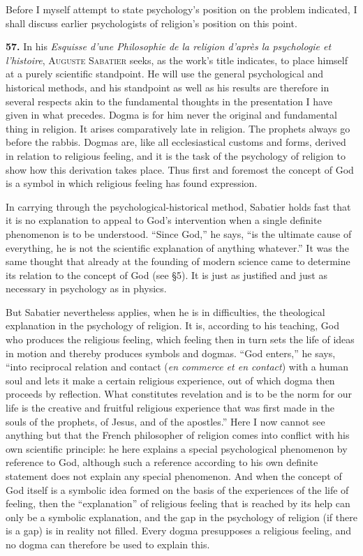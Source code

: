 \documentclass[12pt,a4paper]{book}
\newcommand{\opage}[1]{\marginnote{\footnotesize\textit{[#1]}}}
\begin{document}
Before I myself attempt to state psychology's position on the problem indicated, I shall discuss
earlier psychologists of religion's position on this point.

\medskip

\noindent\textbf{57.} In his \emph{Esquisse d'une Philosophie de la religion d'après la
psychologie et l'histoire}, \textsc{Auguste Sabatier} seeks, as the work's title indicates, to
place himself at a purely scientific standpoint. He will use the general psychological and
historical methods, and his standpoint as well as his results are therefore in several respects
akin to the fundamental thoughts in the presentation I have given in what precedes. Dogma is
for him never the original and fundamental thing in religion. It arises comparatively late in
religion. The prophets always go before the rabbis. Dogmas are, like all ecclesiastical customs
and forms, derived in relation to religious feeling, and it is the task of the psychology of
religion to show how this derivation takes place. Thus first and foremost the concept of God is
a symbol in which religious feeling has found expression.

In carrying through the psychological-historical method, Sabatier holds fast that it is no
explanation to appeal to God's intervention when a single definite phenomenon is to be
understood. ``Since God,'' he says, ``is the ultimate cause of everything, he is not the
scientific explanation of anything whatever.'' It was the same thought that already at the
founding of modern science came to determine its relation to the concept of God (see §5). It is
just as justified and just as necessary in psychology as in physics.

But Sabatier nevertheless applies, when he is in difficulties, the theological explanation in the
psychology of religion. It is, according to his teaching, God who produces the religious feeling,
which feeling then in turn sets the life of ideas in motion and thereby produces symbols and
dogmas. ``God enters,'' he says, ``into reciprocal relation and contact (\textit{en commerce et
en contact}) with a human soul and lets it make a certain religious experience, out of which dogma
then proceeds by reflection. What constitutes revelation and is to be the norm for our life is the
creative and fruitful religious experience that was first made in the souls of the 
\opage{128}prophets, of
Jesus, and of the apostles.'' Here I now cannot see anything but that the French philosopher of
religion comes into conflict with his own scientific principle: he here explains a special
psychological phenomenon by reference to God, although such a reference according to his own
definite statement does not explain any special phenomenon. And when the concept of God itself is
a symbolic idea formed on the basis of the experiences of the life of feeling, then the
``explanation'' of religious feeling that is reached by its help can only be a symbolic
explanation, and the gap in the psychology of religion (if there is a gap) is in reality not
filled. Every dogma presupposes a religious feeling, and no dogma can therefore be used to explain
this.
\end{document}
